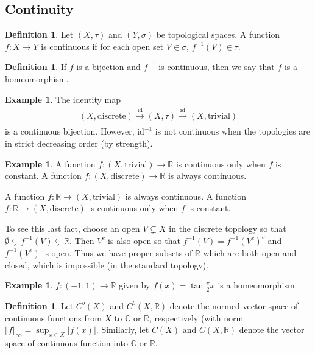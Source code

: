 \documentclass[11pt]{amsart}
\theoremstyle{definition}
\newtheorem{definition}[theorem]{Definition}
\newtheorem{example}[theorem]{Example}
\numberwithin{equation}{section}
\begin{document}
\subsection{Continuity}
\begin{definition}
    Let $(X,\tau)$ and $(Y,\sigma)$ be topological spaces. A function $f:X\to Y$ is continuous if for each open set $V\in\sigma$, $f^{-1}(V)\in \tau$.
\end{definition}
\begin{definition}
    If $f$ is a bijection and $f^{-1}$ is continuous, then we say that $f$ is a homeomorphism.
\end{definition}
\begin{example}
    The identity map
    \begin{align*}
        (X,\mathrm{discrete})\xrightarrow[]{\mathrm{id}}(X,\tau)\xrightarrow[]{\mathrm{id}}(X,\mathrm{trivial})
    \end{align*}
    is a continuous bijection. However, $\mathrm{id}^{-1}$ is not continuous when the topologies are in strict decreasing order (by strength).
\end{example}
\begin{example}
    A function $f:(X,\mathrm{trivial})\to\mathbb R$ is continuous only when $f$ is constant. A function $f:(X,\mathrm{discrete})\to\mathbb R$ is always continuous.

    A function $f:\mathbb R\to(X,\mathrm{trivial})$ is always continuous. A function $f:\mathbb R\to(X,\mathrm{discrete})$ is continuous only when $f$ is constant.

    To see this last fact, choose an open $V\subsetneq X$ in the discrete topology so that $\emptyset\subsetneq f^{-1}(V)\subsetneq \mathbb R$. Then $V^c$ is also open so that $f^{-1}(V)=f^{-1}(V^c)^c$ and $f^{-1}(V^c)$ is open. Thus we have proper subsets of $\mathbb R$ which are both open and closed, which is impossible (in the standard topology).
\end{example}
\begin{example}
    $f:(-1,1)\to\mathbb R$ given by $f(x)=\tan\frac{\pi}{2}x$ is a homeomorphism.
\end{example}
\begin{definition}
    Let $C^b(X)$ and $C^b(X,\mathbb R)$ denote the normed vector space of continuous functions from $X$ to $\mathbb C$ or $\mathbb R$, respectively (with norm $\Vert f\Vert_\infty=\sup_{x\in X}|f(x)|$. Similarly, let $C(X)$ and $C(X,\mathbb R)$ denote the vector space of continuous function into $\mathbb C$ or $\mathbb R$.
\end{definition}
\end{document}
